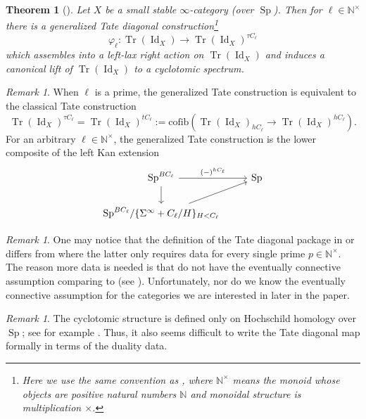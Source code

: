 \documentclass[11pt]{amsart}
\numberwithin{equation}{section}
\theoremstyle{plain}
\newtheorem{Thm}{Theorem}[section]
\theoremstyle{definition}
\theoremstyle{remark}
\newtheorem{RMK}[rmk]{Remark}
\newcommand{\bN} { {\mathbb{N}}}
\newcommand{\Id}{{\operatorname{Id}}}
\newcommand\Tr{\operatorname{Tr}}
\newcommand\Sp{ {\operatorname{Sp} } }
\begin{document}
\begin{Thm}[{\cite[Theorem B]{AMGR-cyclotomic}}]\label{thm:AMGR-cylotomic}
    Let $X$ be a small stable $\infty$-category (over $\Sp$). Then for $\ell \in \bN^\times$ there is a generalized Tate diagonal construction\footnote{Here we use the same convention as \cite{AMGR-cyclotomic,AMGR-naive}, where $\bN^\times$ means the monoid whose objects are positive natural numbers $\bN$ and monoidal structure is multiplication $\times$.}
    \[\varphi_\ell: \Tr(\Id_X) \to \Tr(\Id_X)^{\tau C_\ell}\]
    which assembles into a left-lax right action on $\Tr(\Id_X)$ and induces a canonical lift of $\Tr(\Id_X)$ to a cyclotomic spectrum.
\end{Thm}
\begin{RMK}
    When $\ell$ is a prime, the generalized Tate construction is equivalent to the classical Tate construction
    \[\Tr(\Id_X)^{\tau C_\ell} = \Tr(\Id_X)^{t C_\ell} := \mathrm{cofib}(\Tr(\Id_X)_{h C_\ell} \to \Tr(\Id_X)^{h C_\ell}).\]
    For an arbitrary $\ell \in \bN^\times$, the generalized Tate construction is the lower composite of the left Kan extension \cite[Remark 2.16]{AMGR-naive}
    \[\begin{tikzcd}
    \Sp^{BC_\ell} \ar[r,"(-)^{hC_\ell}"] \ar[d] & \Sp \\
    \Sp^{BC_\ell}/\{\Sigma^\infty+{C_\ell/H} \}_{H < C_\ell} \ar[ur]
    \end{tikzcd}\]
\end{RMK}
\begin{RMK}
   One may notice that the definition of the Tate diagonal package in \cite[Theorem A]{AMGR-cyclotomic} or \cite[Theorem B]{AMGR-naive} differs from \cite[Definition II.1.2]{Nikolaus-Scholze-Ontopologicalcyclichomology} where the latter only requires data for every single prime $p \in \bN^\times$. The reason more data is needed is that \cite{AMGR-cyclotomic,AMGR-naive} do not have the eventually connective assumption comparing to \cite[Theorem II.6.3]{Nikolaus-Scholze-Ontopologicalcyclichomology} (see \cite[Remark 0.11]{AMGR-naive}). Unfortunately, nor do we know the eventually connective assumption for the categories we are interested in later in the paper.
\end{RMK}
\begin{RMK}
    The cyclotomic structure is defined only on Hochschild homology over $\Sp$; see for example \cite[Theorem III.1.10]{Nikolaus-Scholze-Ontopologicalcyclichomology} \cite[Remark 3.9]{AMGR-naive}. Thus, it also seems difficult to write the Tate diagonal map formally in terms of the duality data.
\end{RMK}
\end{document}
